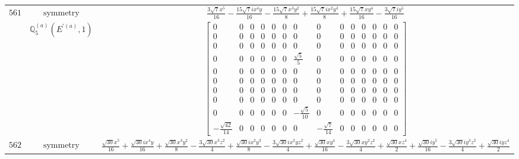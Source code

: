\documentclass[fleqn,8pt,landscape]{jsarticle}
\begin{document}
\begin{longtable}{ccc}
$ 561 $ & $ \text{symmetry} $ & $ \frac{3 \sqrt{7} x^{5}}{16} - \frac{15 \sqrt{7} i x^{4} y}{16} - \frac{15 \sqrt{7} x^{3} y^{2}}{8} + \frac{15 \sqrt{7} i x^{2} y^{3}}{8} + \frac{15 \sqrt{7} x y^{4}}{16} - \frac{3 \sqrt{7} i y^{5}}{16} $ \\
$  $ & $ \mathbb{Q}_{5}^{(a)}(E^{\prime(a)},1) $ & $ \begin{bmatrix} 0 & 0 & 0 & 0 & 0 & 0 & 0 & 0 & 0 & 0 & 0 & 0 & 0 & 0 \\ 0 & 0 & 0 & 0 & 0 & 0 & 0 & 0 & 0 & 0 & 0 & 0 & 0 & 0 \\ 0 & 0 & 0 & 0 & 0 & 0 & 0 & 0 & 0 & 0 & 0 & 0 & 0 & 0 \\ 0 & 0 & 0 & 0 & 0 & 0 & \frac{\sqrt{5}}{5} & 0 & 0 & 0 & 0 & 0 & 0 & 0 \\ 0 & 0 & 0 & 0 & 0 & 0 & 0 & 0 & 0 & 0 & 0 & 0 & 0 & 0 \\ 0 & 0 & 0 & 0 & 0 & 0 & 0 & 0 & 0 & 0 & 0 & 0 & 0 & 0 \\ 0 & 0 & 0 & 0 & 0 & 0 & 0 & 0 & 0 & 0 & 0 & 0 & 0 & 0 \\ 0 & 0 & 0 & 0 & 0 & 0 & 0 & 0 & 0 & 0 & 0 & 0 & 0 & 0 \\ 0 & 0 & 0 & 0 & 0 & 0 & - \frac{\sqrt{5}}{10} & 0 & 0 & 0 & 0 & 0 & 0 & 0 \\ - \frac{\sqrt{42}}{14} & 0 & 0 & 0 & 0 & 0 & 0 & - \frac{\sqrt{7}}{14} & 0 & 0 & 0 & 0 & 0 & 0 \end{bmatrix} $ \\ \hline
$ 562 $ & $ \text{symmetry} $ & $ \frac{\sqrt{30} x^{5}}{16} + \frac{\sqrt{30} i x^{4} y}{16} + \frac{\sqrt{30} x^{3} y^{2}}{8} - \frac{3 \sqrt{30} x^{3} z^{2}}{4} + \frac{\sqrt{30} i x^{2} y^{3}}{8} - \frac{3 \sqrt{30} i x^{2} y z^{2}}{4} + \frac{\sqrt{30} x y^{4}}{16} - \frac{3 \sqrt{30} x y^{2} z^{2}}{4} + \frac{\sqrt{30} x z^{4}}{2} + \frac{\sqrt{30} i y^{5}}{16} - \frac{3 \sqrt{30} i y^{3} z^{2}}{4} + \frac{\sqrt{30} i y z^{4}}{2} $ \\

\end{longtable}
\end{document}

